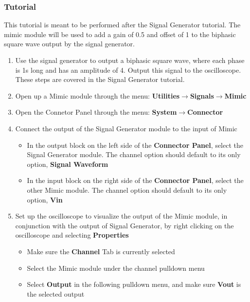 \subsubsection{Tutorial}
\label{mimic tutorial}
This tutorial is meant to be performed after the Signal Generator tutorial. The mimic module will be used to add a gain of 0.5 and offset of 1 to the biphasic square wave output by the signal generator.

\begin{enumerate}
\item Use the signal generator to output a biphasic square wave, where each phase is 1s long and has an amplitude of 4. Output this signal to the oscilloscope. These steps are covered in the Signal Generator tutorial. 
\item Open up a Mimic module through the menu: \textbf{Utilities}$\rightarrow$\textbf{Signals}$\rightarrow$\textbf{Mimic}
\item Open the Connetor Panel through the menu: \textbf{System}$\rightarrow$\textbf{Connector}
\item Connect the output of the Signal Generator module to the input of Mimic
  \begin{itemize}
  \item In the output block on the left side of the \textbf{Connector Panel}, select the Signal Generator module. The channel option should default to its only option, \textbf{Signal Waveform}
  \item In the input block on the right side of the \textbf{Connector Panel}, select the other Mimic module. The channel option should default to its only option, \textbf{Vin}
  \end{itemize}
\item Set up the oscilloscope to visualize the output of the Mimic module, in conjunction with the output of Signal Generator,  by right clicking on the oscilloscope and selecting \textbf{Properties}
  \begin{itemize}
  \item Make sure the \textbf{Channel} Tab is currently selected
  \item Select the Mimic module under the channel pulldown menu
  \item Select \textbf{Output} in the following pulldown menu, and make sure \textbf{Vout} is the selected output

\end{itemize}
\end{enumerate}
